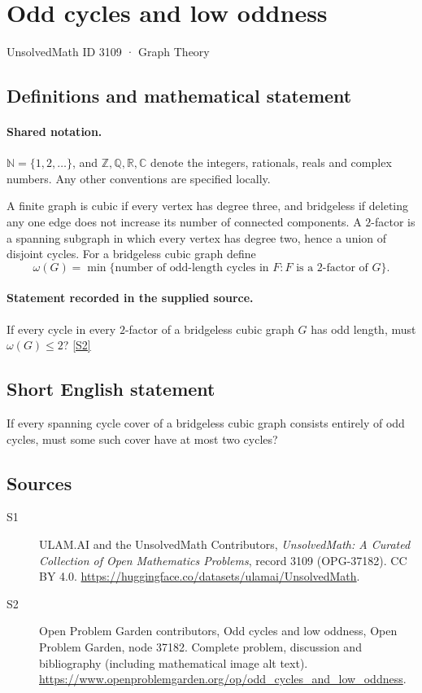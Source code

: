 \documentclass[11pt]{book}
\newcommand{\sref}[2]{\hyperlink{source:#1:#2}{[S#2]}}
\begin{document}
\setcounter{section}{3108}
\section{Odd cycles and low oddness}\label{3109}
{\small\sffamily UnsolvedMath ID 3109 · Graph Theory}
\subsection{Definitions and mathematical statement}

\paragraph{Shared notation.}$\mathbb N=\{1,2,\ldots\}$, and $\mathbb Z,\mathbb Q,\mathbb R,\mathbb C$ denote the integers, rationals, reals and complex numbers. Any other conventions are specified locally.


A finite graph is cubic if every vertex has degree three, and bridgeless if deleting any one edge does not increase its number of connected components. A $2$-factor is a spanning subgraph in which every vertex has degree two, hence a union of disjoint cycles. For a bridgeless cubic graph define
\[\omega(G)=\min\{\text{number of odd-length cycles in }F:F\text{ is a }2\text{-factor of }G\}.\]
\paragraph{Statement recorded in the supplied source.}
If every cycle in every $2$-factor of a bridgeless cubic graph $G$ has odd length, must $\omega(G)\leq2$? \sref{3109}{2}
\subsection{Short English statement}
If every spanning cycle cover of a bridgeless cubic graph consists entirely of odd cycles, must some such cover have at most two cycles?
\subsection{Sources}
\begin{description}
\item[\hypertarget{source:3109:1}{S1}] ULAM.AI and the UnsolvedMath Contributors, \emph{UnsolvedMath: A Curated Collection of Open Mathematics Problems}, record 3109 (OPG-37182). CC BY 4.0. \url{https://huggingface.co/datasets/ulamai/UnsolvedMath}.
\item[\hypertarget{source:3109:2}{S2}] Open Problem Garden contributors, Odd cycles and low oddness, Open Problem Garden, node 37182. Complete problem, discussion and bibliography (including mathematical image alt text). \url{https://www.openproblemgarden.org/op/odd_cycles_and_low_oddness}.
\end{description}
\label{end:3109}
\end{document}
